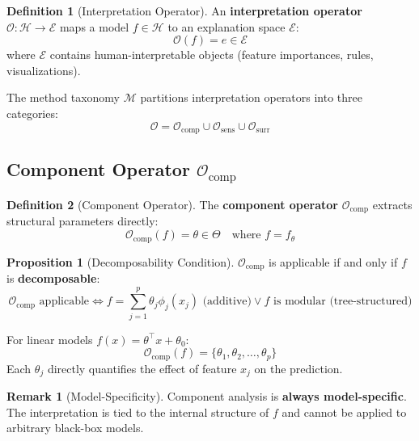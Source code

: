 \documentclass[11pt,a4paper]{article}
\theoremstyle{definition}
\newtheorem{definition}{Definition}[section]
\newtheorem{proposition}{Proposition}[section]
\newtheorem{remark}{Remark}[section]
\newcommand{\Ocomp}{\mathcal{O}_{\text{comp}}}
\newcommand{\Osens}{\mathcal{O}_{\text{sens}}}
\newcommand{\Osurr}{\mathcal{O}_{\text{surr}}}
\begin{document}
\begin{definition}[Interpretation Operator]
An \textbf{interpretation operator} $\mathcal{O}: \mathcal{H} \to \mathcal{E}$ maps a model $f \in \mathcal{H}$ to an explanation space $\mathcal{E}$:
\begin{equation}
\mathcal{O}(f) = e \in \mathcal{E}
\end{equation}
where $\mathcal{E}$ contains human-interpretable objects (feature importances, rules, visualizations).
\end{definition}

The method taxonomy $\mathcal{M}$ partitions interpretation operators into three categories:
\begin{equation}
\mathcal{O} = \Ocomp \cup \Osens \cup \Osurr
\end{equation}

\subsection{Component Operator $\Ocomp$}

\begin{definition}[Component Operator]
The \textbf{component operator} $\Ocomp$ extracts structural parameters directly:
\begin{equation}
\Ocomp(f) = \theta \in \Theta \quad \text{where } f = f_\theta
\end{equation}
\end{definition}

\begin{proposition}[Decomposability Condition]
$\Ocomp$ is applicable if and only if $f$ is \textbf{decomposable}:
\begin{equation}
\boxed{\Ocomp \text{ applicable} \iff f = \sum_{j=1}^{p} \theta_j \phi_j(x_j) \text{ (additive)} \lor f \text{ is modular (tree-structured)}}
\end{equation}
\end{proposition}

For linear models $f(x) = \theta^\top x + \theta_0$:
\begin{equation}
\Ocomp(f) = \{\theta_1, \theta_2, \ldots, \theta_p\}
\end{equation}
Each $\theta_j$ directly quantifies the effect of feature $x_j$ on the prediction.

\begin{remark}[Model-Specificity]
Component analysis is \textbf{always model-specific}. The interpretation is tied to the internal structure of $f$ and cannot be applied to arbitrary black-box models.
\end{remark}
\end{document}
